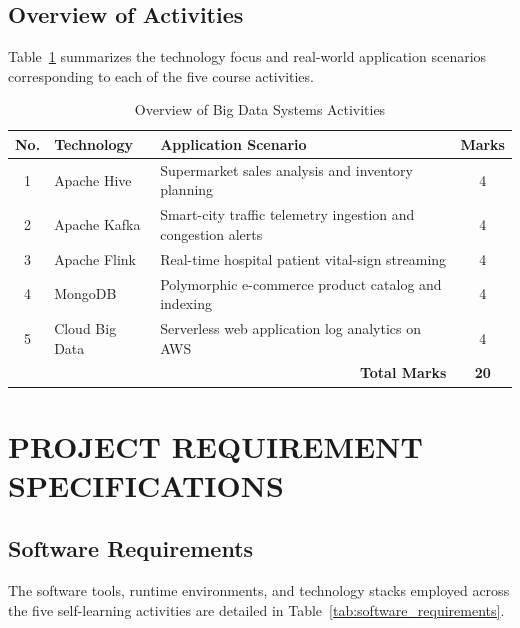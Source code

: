 \documentclass[12pt,a4paper]{report}
\begin{document}
\section{Overview of Activities}
Table~\ref{tab:overview_activities} summarizes the technology focus and real-world application scenarios corresponding to each of the five course activities.

\begin{table}[H]
\centering
\caption{Overview of Big Data Systems Activities}
\label{tab:overview_activities}
\begin{tabularx}{\textwidth}{|c|l|X|c|}
\hline
\textbf{No.} & \textbf{Technology} & \textbf{Application Scenario} & \textbf{Marks}\\
\hline
1 & Apache Hive & Supermarket sales analysis and inventory planning & 4\\
\hline
2 & Apache Kafka & Smart-city traffic telemetry ingestion and congestion alerts & 4\\
\hline
3 & Apache Flink & Real-time hospital patient vital-sign streaming & 4\\
\hline
4 & MongoDB & Polymorphic e-commerce product catalog and indexing & 4\\
\hline
5 & Cloud Big Data & Serverless web application log analytics on AWS & 4\\
\hline
\multicolumn{3}{|r|}{\textbf{Total Marks}} & \textbf{20}\\
\hline
\end{tabularx}
\end{table}

\chapter{PROJECT REQUIREMENT SPECIFICATIONS}

\section{Software Requirements}
The software tools, runtime environments, and technology stacks employed across the five self-learning activities are detailed in Table~\ref{tab:software_requirements}.
\end{document}
